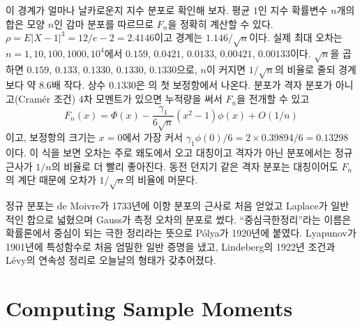 이 경계가 얼마나 날카로운지 지수 분포로 확인해 보자. 평균 $1$인 지수 확률변수 $n$개의 합은 모양 $n$인 감마 분포를 따르므로 $F_n$을 정확히 계산할 수 있다. $\rho=E|X-1|^3=12/e-2=2.4146$이고 경계는 $1.146/\sqrt n$이다. 실제 최대 오차는 $n=1,10,100,1000,10^4$에서 $0.159$, $0.0421$, $0.0133$, $0.00421$, $0.00133$이다. $\sqrt n$을 곱하면 $0.159$, $0.133$, $0.1330$, $0.1330$, $0.1330$으로, $n$이 커지면 $1/\sqrt n$의 비율로 줄되 경계보다 약 $8.6$배 작다. 상수 $0.1330$은 의 첫 보정항에서 나온다. 분포가 격자 분포가 아니고(Cramér 조건) 4차 모멘트가 있으면 누적량을 써서 $F_n$을 전개할 수 있고
\[
F_n(x)=\Phi(x)-\frac{\gamma_1}{6\sqrt n}(x^2-1)\phi(x)+O(1/n)
\]
이고, 보정항의 크기는 $x=0$에서 가장 커서 $\gamma_1\phi(0)/6=2\times0.39894/6=0.13298$이다. 이 식을 보면 오차는 주로 왜도에서 오고 대칭이고 격자가 아닌 분포에서는 정규 근사가 $1/n$의 비율로 더 빨리 좋아진다. 동전 던지기 같은 격자 분포는 대칭이어도 $F_n$의 계단 때문에 오차가 $1/\sqrt n$의 비율에 머문다.

\begin{aside}
정규 분포는 de Moivre가 1733년에 이항 분포의 근사로 처음 얻었고 Laplace가 일반적인 합으로 넓혔으며 Gauss가 측정 오차의 분포로 썼다. ``중심극한정리''라는 이름은 확률론에서 중심이 되는 극한 정리라는 뜻으로 Pólya가 1920년에 붙였다\cite{polya1920}. Lyapunov가 1901년에 특성함수로 처음 엄밀한 일반 증명을 냈고, Lindeberg의 1922년 조건과 Lévy의 연속성 정리로 오늘날의 형태가 갖추어졌다.
\end{aside}

\section{Computing Sample Moments}
\label{sec:sample-moments}

